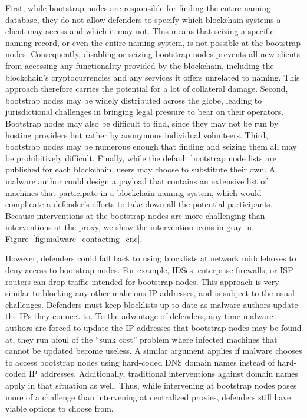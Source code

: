First, while bootstrap nodes are responsible for finding the 
entire naming database, they do not allow defenders to 
specify which blockchain systems a client may access and 
which it may not. This means that seizing a specific naming 
record, or even the entire naming system, is not possible at 
the bootstrap nodes. Consequently, disabling or seizing 
bootstrap nodes prevents all new clients from accessing any 
functionality provided by the blockchain, including the 
blockchain's cryptocurrencies and any services it offers 
unrelated to naming. This approach therefore carries the 
potential for a lot of collateral damage. Second, bootstrap 
nodes may be widely distributed across the globe, leading to 
jurisdictional challenges in bringing legal pressure to bear 
on their operators. Bootstrap nodes may also be difficult to 
find, since they may not be run by hosting providers but 
rather by anonymous individual volunteers. Third, bootstrap 
nodes may be numerous enough that finding and seizing them 
all may be prohibitively difficult. Finally, while the 
default bootstrap node lists are published for each 
blockchain, users may choose to substitute their own. A 
malware author could design a payload that contains an 
extensive list of machines that participate in a blockchain 
naming system, which would complicate a defender's efforts to 
take down all the potential participants. Because 
interventions at the bootstrap nodes are more challenging 
than interventions at the proxy, we show the intervention 
icons in gray in Figure~\ref{fig:malware_contacting_cnc}.

However, defenders could fall back to using blocklists at 
network middleboxes to deny access to bootstrap nodes. For 
example, IDSes, enterprise firewalls, or ISP routers can drop 
traffic intended for bootstrap nodes. This approach is very 
similar to blocking any other 
malicious IP addresses, and is subject to the usual 
challenges. Defenders must keep blocklists up-to-date as 
malware authors update the IPs they connect to. To the 
advantage of defenders, any time malware authors 
are forced to update the IP addresses that bootstrap nodes 
may be found at, they run afoul of the ``sunk cost'' problem 
where infected machines that cannot be updated become
useless. A similar argument applies if malware chooses to 
access bootstrap nodes using hard-coded DNS domain names 
instead of hard-coded IP addresses. Additionally, 
traditional interventions against domain names apply in that 
situation as well. Thus, while intervening at bootstrap nodes 
poses more of a challenge than intervening at centralized 
proxies, defenders still have viable options to choose from.

